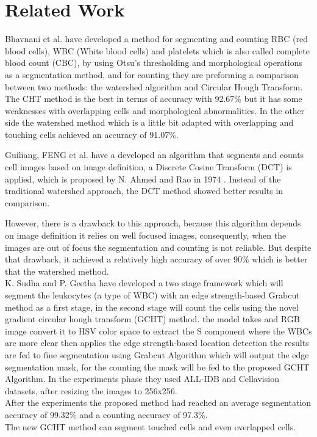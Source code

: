\documentclass[conference]{IEEEtran}
\begin{document}
\section{Related Work}
Bhavnani et al. \cite{bhavnani2016segmentation} have developed a method for segmenting and counting RBC (red blood cells), WBC (White blood cells) and platelets which is also called complete blood count (CBC), by using Otsu’s thresholding and morphological operations as a segmentation method, and for counting they are preforming a comparison between two methods: the watershed algorithm and Circular Hough Transform. The CHT method is the best in terms of accuracy with 92.67\% but it has some weaknesses with overlapping cells and morphological abnormalities. In the other side the watershed method which is a little bit adapted with overlapping and touching cells achieved an accuracy of 91.07\%.\

Guiliang, FENG et al.\cite{guiliang2016microscopic} have a developed an algorithm that segments and counts cell images based on image definition, a Discrete Cosine Transform (DCT) is applied, which is proposed by N. Ahmed and Rao in 1974 \cite{ahmed1974discrete}. Instead of the traditional watershed approach, the DCT method showed better results in comparison.\

However, there is a drawback to this approach, because this algorithm depends on image definition it relies on well focused images, consequently, when the images are out of focus the segmentation and counting is not reliable. But despite that drawback, it achieved a relatively high accuracy of over 90\% which is better that the watershed method.\\

K. Sudha and P. Geetha \cite{SUDHA2020639} have developed a two stage framework which will segment the leukocytes (a type of WBC) with an edge strength-based Grabcut method as a first stage, in the second stage will count the cells using the novel gradient circular hough transform (GCHT) method. the model takes and RGB image convert it to HSV color space to extract the S component where the WBCs are more clear then applies the edge strength-based location detection the results are fed to fine segmentation using Grabcut Algorithm which will output the edge segmentation mask, for the counting the mask will be fed to the proposed GCHT Algorithm. In the experiments phase they used ALL-IDB \cite{labati2011all} and Cellavision \cite{Zheng2018} datasets, after resizing the images to 256x256.\\
After the experiments the proposed method had reached an average segmentation accuracy of 99.32\% and a counting accuracy of 97.3\%.\\
The new GCHT method can segment touched cells and even overlapped cells.
\end{document}
